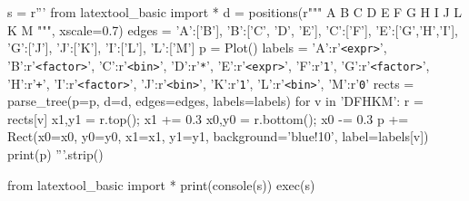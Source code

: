 \begin{python}
s = r'''
from latextool_basic import *
d = positions(r"""
   A
   B
C  D  E
F   G H I
    J   L
    K   M
""", xscale=0.7)
edges = {'A':['B'],          'B':['C', 'D', 'E'], 'C':['F'],
         'E':['G','H','I'],  'G':['J'],           'J':['K'],
         'I':['L'],          'L':['M']}
p = Plot()
labels = {'A':r'\texttt{<expr>}',   'B':r'\texttt{<factor>}',
          'C':r'\texttt{<bin>}',    'D':r'\texttt{*}',
          'E':r'\texttt{<expr>}',   'F':r'\texttt{1}',
          'G':r'\texttt{<factor>}', 'H':r'\texttt{+}',
          'I':r'\texttt{<factor>}', 'J':r'\texttt{<bin>}',
          'K':r'\texttt{1}',        'L':r'\texttt{<bin>}',
          'M':r'\texttt{0}'}
rects = parse_tree(p=p, d=d, edges=edges, labels=labels)
for v in 'DFHKM':
    r = rects[v]
    x1,y1 = r.top(); x1 += 0.3
    x0,y0 = r.bottom(); x0 -= 0.3
    p += Rect(x0=x0, y0=y0, x1=x1, y1=y1, background='blue!10',
              label=labels[v])
print(p)
'''.strip()

from latextool_basic import *
print(console(s))
exec(s)
\end{python}
